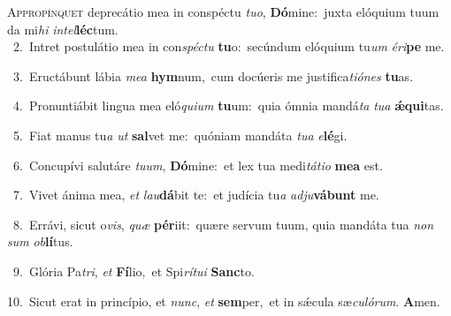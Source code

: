 \lettrine{\initial\textcolor{\initialcolor}{A}}{ppropínquet} deprecátio mea in conspéctu \textit{tu}\-\textit{o}, \textbf{Dó}\-mine:~\star juxta elóquium tuum da mi\textit{hi} \textit{in}\-\textit{tel}\textbf{léc}tum.\\
{\numbfont\textcolor{\numbcolor}{~2.}}~Intret postulátio mea in con\-\textit{spéc}\-\textit{tu} \textbf{tu}\-o:~\star secúndum elóquium tu\textit{um} \textit{é}\-\textit{ri}\textbf{pe} me.\par
{\numbfont\textcolor{\numbcolor}{~3.}}~Eructábunt lábia \textit{me}\-\textit{a} \textbf{hym}\-num,~\star cum docúeris me justifica\-\textit{ti}\-\textit{ó}\textit{nes} \textbf{tu}\-as.\par
{\numbfont\textcolor{\numbcolor}{~4.}}~Pronuntiábit lingua mea eló\-\textit{qui}\-\textit{um} \textbf{tu}\-um:~\star quia ómnia mandá\textit{ta} \textit{tu}\-\textit{a} \textbf{ǽ}\-\textbf{qui}tas.\par
{\numbfont\textcolor{\numbcolor}{~5.}}~Fiat manus tu\textit{a} \textit{ut} \textbf{sal}\-vet me:~\star quóniam mandáta \textit{tu}\-\textit{a} \textit{e}\-\textbf{lé}gi.\par
{\numbfont\textcolor{\numbcolor}{~6.}}~Concupívi salutáre \textit{tu}\-\textit{um}, \textbf{Dó}\-mine:~\star et lex tua medi\-\textit{tá}\-\textit{ti}\textit{o} \textbf{me}\-\textbf{a} est.\par
{\numbfont\textcolor{\numbcolor}{~7.}}~Vivet ánima mea, \textit{et} \textit{lau}\-\textbf{dá}bit te:~\star et judícia tu\textit{a} \textit{ad}\-\textit{ju}\textbf{vá}\textbf{bunt} me.\par
{\numbfont\textcolor{\numbcolor}{~8.}}~Errávi, sicut o\-\textit{vis}\-, \textit{quæ} \textbf{pér}\-iit:~\star quære servum tuum, quia mandáta tua \textit{non} \textit{sum} \textit{ob}\-\textbf{lí}tus.\par
{\numbfont\textcolor{\numbcolor}{~9.}}~Glória Pa\-\textit{tri}\-, \textit{et} \textbf{Fí}\-lio,~\star et Spi\-\textit{rí}\-\textit{tu}\textit{i} \textbf{Sanc}\-to.\par
{\numbfont\textcolor{\numbcolor}{10.}}~Sicut erat in princípio, et \textit{nunc}\-, \textit{et} \textbf{sem}\-per,~\star et in sǽcula sæ\-\textit{cu}\-\textit{ló}\textit{rum}. \textbf{A}\-men.\par
